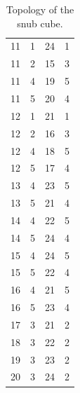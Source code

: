\documentclass[a4paper, amsfonts, amssymb, amsmath, reprint, showkeys, nofootinbib, twoside]{revtex4-1}
\begin{document}
\begin{table}[h!]
\begin{tabular}{ cccc }
		11 & 1 & 24 & 1 \\
		11 & 2 & 15 & 3 \\
		11 & 4 & 19 & 5 \\
		11 & 5 & 20 & 4 \\
		12 & 1 & 21 & 1 \\
		12 & 2 & 16 & 3 \\
		12 & 4 & 18 & 5 \\
		12 & 5 & 17 & 4 \\
		13 & 4 & 23 & 5 \\
		13 & 5 & 21 & 4 \\
		14 & 4 & 22 & 5 \\
		14 & 5 & 24 & 4 \\
		15 & 4 & 24 & 5 \\
		15 & 5 & 22 & 4 \\
		16 & 4 & 21 & 5 \\
		16 & 5 & 23 & 4 \\
		17 & 3 & 21 & 2 \\
		18 & 3 & 22 & 2 \\
		19 & 3 & 23 & 2 \\
		20 & 3 & 24 & 2 \\
		\hline
	\end{tabular}
	\caption{Topology of the snub cube.}
\end{table}

\pagebreak
\end{document}
